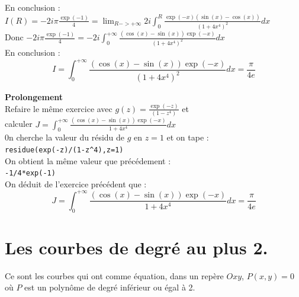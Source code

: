 \documentclass[a4paper,11pt]{book}
\begin{document}
En conclusion :\\
$\displaystyle I(R)=-2i\pi\frac{\exp(-1)}{4}= \lim_{R->+\infty}2i\int_0^R \frac{\exp(-x)(\sin(x)-\cos(x))}{(1+4x^4)^2}dx$\\
Donc 
$\displaystyle -2i\pi\frac{\exp(-1)}{4}=-2i\int_0^{+\infty}\frac{(\cos(x)-\sin(x))\exp(-x)}{(1+4x^4)^2}dx$\\
En conclusion :
$$I=\int_0^{+\infty}\frac{(\cos(x)-\sin(x))\exp(-x)}{(1+4x^4)^2}dx=\frac{\pi}{4e}$$

{\bf Prolongement}\\
Refaire le m\^eme exercice avec $g(z)=\frac{\exp(-z)}{(1-z^4)}$ et\\
calculer $J=\int_0^{+\infty}\frac{(\cos(x)-\sin(x))\exp(-x)}{1+4x^4}dx$\\
0n cherche la valeur du r\'esidu de $g$ en $z=1$ et on tape :\\
{\tt residue(exp(-z)/(1-z\verb|^|4),z=1)} \\
On obtient la m\^eme valeur que pr\'ec\'edement :\\
{\tt -1/4*exp(-1)}\\
On d\'eduit de l'exercice pr\'ec\'edent que :
$$J=\int_0^{+\infty}\frac{(\cos(x)-\sin(x))\exp(-x)}{1+4x^4}dx=\frac{\pi}{4e}$$

\chapter{Les courbes de degr\'e au plus 2.}
Ce sont les courbes qui ont comme \'equation, dans un rep\`ere $Oxy$, 
$P(x,y)=0$ o\`u $P$ est un polyn\^ome de degr\'e inf\'erieur ou \'egal
\`a 2.
\end{document}
